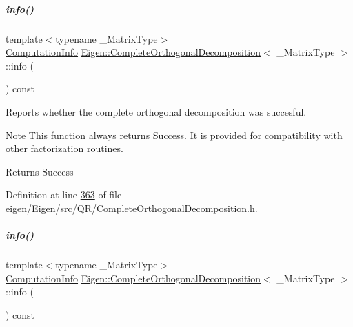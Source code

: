 \mbox{\label{group___q_r___module_a1f5c45f78848cfdbb96963cefbbb3274}} 
\subparagraph{\texorpdfstring{info()}{info()}\hspace{0.1cm}{\footnotesize\ttfamily [1/2]}}
{\footnotesize\ttfamily template$<$typename \+\_\+\+Matrix\+Type$>$ \\
\hyperlink{group__enums_ga85fad7b87587764e5cf6b513a9e0ee5e}{Computation\+Info} \hyperlink{group___q_r___module_class_eigen_1_1_complete_orthogonal_decomposition}{Eigen\+::\+Complete\+Orthogonal\+Decomposition}$<$ \+\_\+\+Matrix\+Type $>$\+::info (\begin{DoxyParamCaption}{ }\end{DoxyParamCaption}) const\hspace{0.3cm}{\ttfamily [inline]}}



Reports whether the complete orthogonal decomposition was succesful. 

\begin{DoxyNote}{Note}
This function always returns {\ttfamily Success}. It is provided for compatibility with other factorization routines. 
\end{DoxyNote}
\begin{DoxyReturn}{Returns}
{\ttfamily Success} 
\end{DoxyReturn}


Definition at line \hyperlink{eigen_2_eigen_2src_2_q_r_2_complete_orthogonal_decomposition_8h_source_l00363}{363} of file \hyperlink{eigen_2_eigen_2src_2_q_r_2_complete_orthogonal_decomposition_8h_source}{eigen/\+Eigen/src/\+Q\+R/\+Complete\+Orthogonal\+Decomposition.\+h}.

\mbox{\label{group___q_r___module_a1f5c45f78848cfdbb96963cefbbb3274}} 
\subparagraph{\texorpdfstring{info()}{info()}\hspace{0.1cm}{\footnotesize\ttfamily [2/2]}}
{\footnotesize\ttfamily template$<$typename \+\_\+\+Matrix\+Type$>$ \\
\hyperlink{group__enums_ga85fad7b87587764e5cf6b513a9e0ee5e}{Computation\+Info} \hyperlink{group___q_r___module_class_eigen_1_1_complete_orthogonal_decomposition}{Eigen\+::\+Complete\+Orthogonal\+Decomposition}$<$ \+\_\+\+Matrix\+Type $>$\+::info (\begin{DoxyParamCaption}{ }\end{DoxyParamCaption}) const\hspace{0.3cm}{\ttfamily [inline]}}



